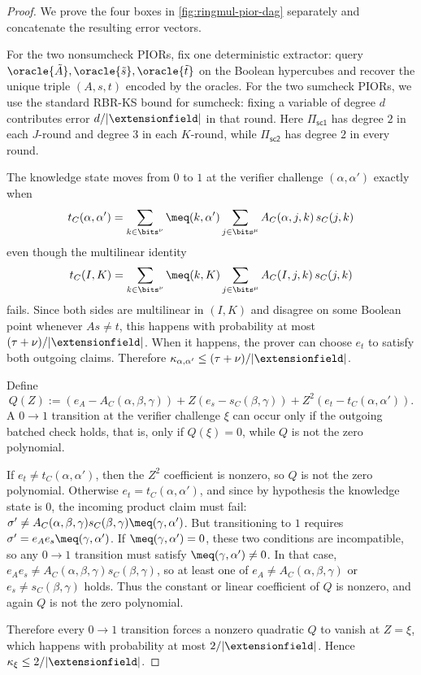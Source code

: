 \begin{proof}
We prove the four boxes in \cref{fig:ringmul-pior-dag} separately and concatenate the resulting error vectors.

For the two nonsumcheck PIORs, fix one deterministic extractor: query $\oracle{\tilde A},\oracle{\tilde s},\oracle{\tilde t}$ on the Boolean hypercubes and recover the unique triple $(A,s,t)$ encoded by the oracles. For the two sumcheck PIORs, we use the standard RBR-KS bound for sumcheck: fixing a variable of degree $d$ contributes error $d/|\extensionfield|$ in that round. Here $\Pi_{\mathsf{sc1}}$ has degree $2$ in each $J$-round and degree $3$ in each $K$-round, while $\Pi_{\mathsf{sc2}}$ has degree $2$ in every round.

The knowledge state moves from $0$ to $1$ at the verifier challenge $(\alpha,\alpha')$ exactly when
\[
t_C(\alpha,\alpha')
=
\sum_{k\in\bits^\nu}\meq(k,\alpha')\sum_{j\in\bits^\mu} A_C(\alpha,j,k)\,s_C(j,k)
\]
even though the multilinear identity
\[
t_C(I,K)
=
\sum_{k\in\bits^\nu}\meq(k,K)\sum_{j\in\bits^\mu} A_C(I,j,k)\,s_C(j,k)
\]
fails. Since both sides are multilinear in $(I,K)$ and disagree on some Boolean point whenever $As\neq t$, this happens with probability at most $(\tau+\nu)/|\extensionfield|$. When it happens, the prover can choose $e_t$ to satisfy both outgoing claims. Therefore $\kappa_{\alpha,\alpha'}\le (\tau+\nu)/|\extensionfield|$.

Define
\[
Q(Z) := (e_A - A_C(\alpha,\beta,\gamma)) + Z(e_s - s_C(\beta,\gamma)) + Z^2(e_t - t_C(\alpha,\alpha')).
\]
A $0 \to 1$ transition at the verifier challenge $\xi$ can occur only if the outgoing batched check holds, that is, only if $Q(\xi)=0$, while $Q$ is not the zero polynomial.

If $e_t \neq t_C(\alpha,\alpha')$, then the $Z^2$ coefficient is nonzero, so $Q$ is not the zero polynomial. Otherwise $e_t = t_C(\alpha,\alpha')$, and since by hypothesis the knowledge state is $0$, the incoming product claim must fail: $\sigma' \neq A_C(\alpha,\beta,\gamma)s_C(\beta,\gamma)\meq(\gamma,\alpha')$.
But transitioning to $1$ requires $\sigma' = e_A e_s \meq(\gamma,\alpha')$.
If $\meq(\gamma,\alpha')=0$, these two conditions are incompatible, so any $0 \to 1$ transition must satisfy $\meq(\gamma,\alpha') \neq 0$. In that case,
$e_A e_s \neq A_C(\alpha,\beta,\gamma)s_C(\beta,\gamma)$,
so at least one of $e_A \neq A_C(\alpha,\beta,\gamma)$ or $e_s \neq s_C(\beta,\gamma)$ holds. Thus the constant or linear coefficient of $Q$ is nonzero, and again $Q$ is not the zero polynomial.

Therefore every $0 \to 1$ transition forces a nonzero quadratic $Q$ to vanish at $Z=\xi$, which happens with probability at most $2/|\extensionfield|$. Hence $\kappa_{\xi} \le 2/|\extensionfield|$.
\end{proof}